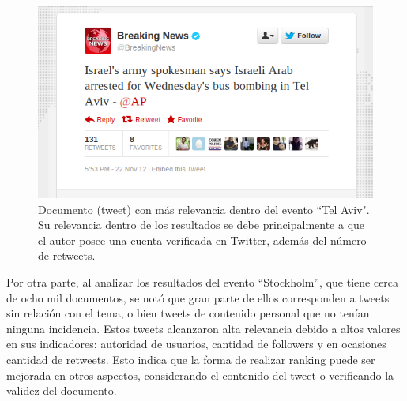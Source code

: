 \begin{figure}    
  \centering
  \includegraphics[width=14cm]{./img/breakingnews.png}
  \caption[Documento con alto puntaje entre los resultados obtenidos]
   { Documento (tweet) con más relevancia dentro del evento ``Tel Aviv". Su relevancia dentro de los resultados se debe principalmente a que el autor posee una cuenta verificada en Twitter, además del número de retweets. \label{fig:bn} }
\end{figure}

    Por otra parte, al analizar los resultados del evento
    ``Stockholm'', que tiene cerca de ocho mil documentos, se notó que
    gran parte de ellos corresponden a tweets sin relación con el tema,
    o bien tweets de contenido personal que no tenían ninguna
    incidencia. Estos tweets alcanzaron alta relevancia debido a altos
    valores en sus indicadores: autoridad de usuarios, cantidad de followers 
    y en ocasiones cantidad de retweets. Esto indica que la forma de
    realizar ranking puede ser mejorada en otros aspectos,
    considerando el contenido del tweet o verificando la validez del documento.

